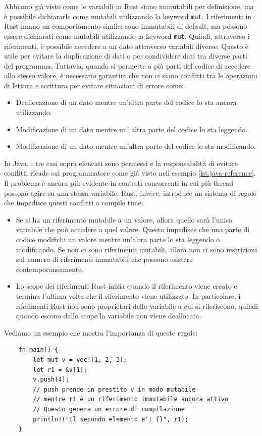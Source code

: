 Abbiamo già visto come le variabili in Rust siano immutabili per definizione, ma è possibile dichiararle come mutabili utilizzando la keyword \texttt{mut}. I riferimenti in Rust hanno un comportamento simile: sono immutabili di default, ma possono essere dichiarati come mutabili utilizzando la keyword \texttt{mut}. Quindi, attraverso i riferimenti, è possibile accedere a un dato attraverso variabili diverse. Questo è utile per evitare la duplicazione di dati o per condividere dati tra diverse parti del programma. Tuttavia, quando si permette a più parti del codice di accedere allo stesso valore, è necessario garantire che non ci siano conflitti tra le operazioni di lettura e scrittura per evitare situazioni di errore come:
\begin{itemize}
    \item Deallocazione di un dato mentre un'altra parte del codice lo sta ancora utilizzando.
    \item Modificazione di un dato mentre un' altra parte del codice lo sta leggendo.
    \item Modificazione di un dato mentre un'altra parte del codice lo sta modificando.
\end{itemize} 
In Java, i tre casi sopra elencati sono permessi e la responsabilità di evitare conflitti ricade sul programmatore come già visto nell'esempio \ref{lst:java-reference}. Il problema è ancora più evidente in contesti concorrenti in cui più thread possono agire su una stessa variabile. Rust, invece, introduce un sistema di regole che impedisce questi conflitti a compile time:
\begin{itemize}
    \item Se si ha un riferimento mutabile a un valore, allora quello sarà l'unica variabile che può accedere a quel valore. Questo impedisce che una parte di codice modifichi un valore mentre un'altra parte lo sta leggendo o modificando. Se non ci sono riferimenti mutabili, allora non ci sono restrizioni sul numero di riferimenti immutabili che possono esistere contemporaneamente. 
    \item Lo scope dei riferimenti Rust inizia quando il riferimento viene creato e termina l'ultima volta che il riferimento viene utilizzato. In particolare, i riferimenti Rust non sono proprietari della variabile a cui si riferiscono, quindi quando escono dallo scope la variabile non viene deallocata.
\end{itemize}
Vediamo un esempio che mostra l'importanza di queste regole:
\begin{verbatim}
    fn main() {
        let mut v = vec![1, 2, 3];
        let r1 = &v[1];
        v.push(4);
        // push prende in prestito v in modo mutabile
        // mentre r1 è un riferimento immutabile ancora attivo
        // Questo genera un errore di compilazione
        println!("Il secondo elemento e': {}", r1);
    } 
\end{verbatim}
